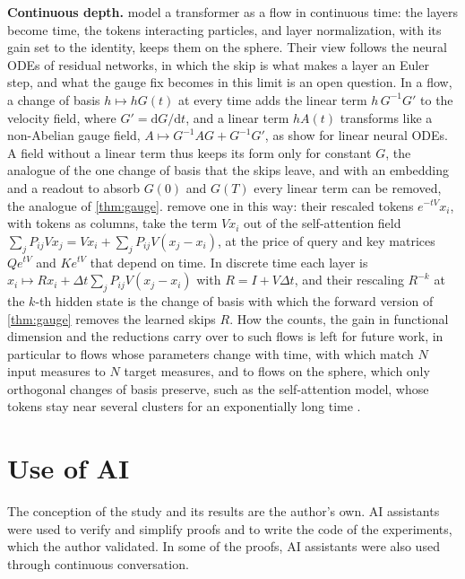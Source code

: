 \documentclass[10pt]{article}
\theoremstyle{definition}
\theoremstyle{remark}
\newcommand{\para}[1]{\smallskip\noindent\textbf{#1}\hspace{0.5em}}
\begin{document}
\para{Continuous depth.} \citet{geshkovski2025transformers} model a transformer as a flow in continuous time: the layers become time, the tokens interacting particles, and layer normalization, with its gain set to the identity, keeps them on the sphere. Their view follows the neural ODEs of residual networks, in which the skip is what makes a layer an Euler step, and what the gauge fix becomes in this limit is an open question. In a flow, a change of basis $h \mapsto hG(t)$ at every time adds the linear term $h\,G^{-1}G'$ to the velocity field, where $G' = \mathrm{d}G/\mathrm{d}t$, and a linear term $hA(t)$ transforms like a non-Abelian gauge field, $A \mapsto G^{-1}AG + G^{-1}G'$, as \citet{hashimoto2024unification} show for linear neural ODEs. A field without a linear term thus keeps its form only for constant $G$, the analogue of the one change of basis that the skips leave, and with an embedding and a readout to absorb $G(0)$ and $G(T)$ every linear term can be removed, the analogue of \cref{thm:gauge}. \citet{geshkovski2023clusters} remove one in this way: their rescaled tokens $e^{-tV}x_i$, with tokens as columns, take the term $Vx_i$ out of the self-attention field $\sum_j P_{ij}Vx_j = Vx_i + \sum_j P_{ij}V(x_j - x_i)$, at the price of query and key matrices $Qe^{tV}$ and $Ke^{tV}$ that depend on time. In discrete time each layer is $x_i \mapsto Rx_i + \Delta t\sum_j P_{ij}V(x_j - x_i)$ with $R = I + V\Delta t$, and their rescaling $R^{-k}$ at the $k$-th hidden state \citep[Remark~3.4]{geshkovski2023clusters} is the change of basis with which the forward version of \cref{thm:gauge} removes the learned skips $R$. How the counts, the gain in functional dimension and the reductions carry over to such flows is left for future work, in particular to flows whose parameters change with time, with which \citet{geshkovski2026measure} match $N$ input measures to $N$ target measures, and to flows on the sphere, which only orthogonal changes of basis preserve, such as the self-attention model, whose tokens stay near several clusters for an exponentially long time \citep{geshkovski2024metastability}.

\section*{Use of AI}
The conception of the study and its results are the author's own. AI assistants were used to verify and simplify proofs and to write the code of the experiments, which the author validated. In some of the proofs, AI assistants were also used through continuous conversation.
\end{document}
